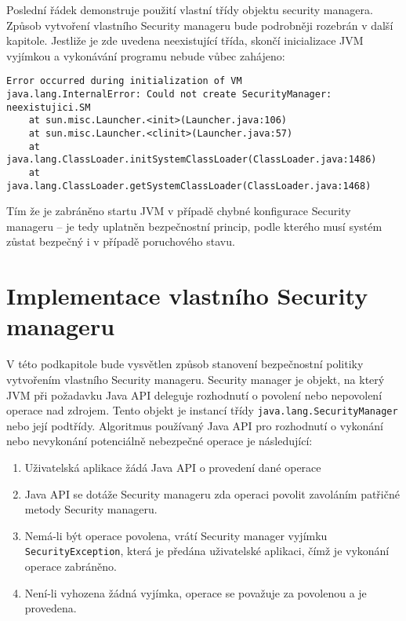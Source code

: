 Poslední řádek demonstruje použití vlastní třídy objektu security managera. Způsob vytvoření vlastního Security manageru bude podrobněji rozebrán v další kapitole. Jestliže je zde uvedena neexistující třída, skončí inicializace JVM vyjímkou a vykonávání programu nebude vůbec zahájeno:

\begin{verbatim}
Error occurred during initialization of VM
java.lang.InternalError: Could not create SecurityManager: neexistujici.SM
    at sun.misc.Launcher.<init>(Launcher.java:106)
    at sun.misc.Launcher.<clinit>(Launcher.java:57)
    at java.lang.ClassLoader.initSystemClassLoader(ClassLoader.java:1486)
    at java.lang.ClassLoader.getSystemClassLoader(ClassLoader.java:1468)
\end{verbatim}

Tím že je zabráněno startu JVM v případě chybné konfigurace Security manageru -- je tedy uplatněn bezpečnostní princip, podle kterého musí systém zůstat bezpečný i v případě poruchového stavu.

\section{Implementace vlastního Security manageru}

V této podkapitole bude vysvětlen způsob stanovení bezpečnostní politiky vytvořením vlastního Security manageru.
Security manager je objekt, na který JVM při požadavku Java API deleguje rozhodnutí o povolení nebo nepovolení operace nad zdrojem.
Tento objekt je instancí třídy {\tt java.lang.SecurityManager} nebo její podtřídy.
Algoritmus používaný Java API pro rozhodnutí o vykonání nebo nevykonání potenciálně nebezpečné operace je následující: \cite[4.1.1]{oaks}

\begin{enumerate}
  \item Uživatelská aplikace žádá Java API o provedení dané operace
  \item Java API se dotáže Security manageru zda operaci povolit zavoláním patřičné metody Security manageru.
  \item Nemá-li být operace povolena, vrátí Security manager vyjímku {\tt SecurityException}, která je předána uživatelské aplikaci, čímž je vykonání operace zabráněno.
  \item Není-li vyhozena žádná vyjímka, operace se považuje za povolenou a je provedena.
\end{enumerate}

